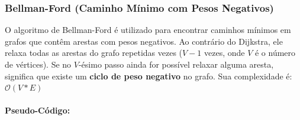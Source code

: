 \subsubsection{Bellman-Ford (Caminho Mínimo com Pesos Negativos)}
O algoritmo de Bellman-Ford é utilizado para encontrar caminhos mínimos em
grafos que contêm arestas com pesos negativos. Ao contrário do Dijkstra, ele
relaxa todas as arestas do grafo repetidas vezes ($V-1$ vezes, onde $V$ é o
número de vértices). Se no $V$-ésimo passo ainda for possível relaxar alguma
aresta, significa que existe um \textbf{ciclo de peso negativo} no grafo. Sua complexidade é: $\mathcal{O}(V * E)$

\paragraph{Pseudo-Código: }\mbox{}\\
\begin{algorithm}[H]
	\SetAlgoLined

	\caption{Algoritmo de BellmanFord}
\end{algorithm}

